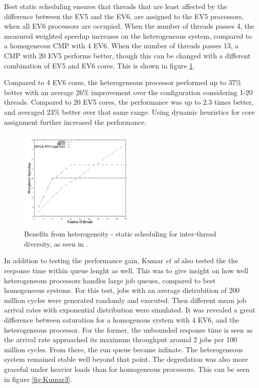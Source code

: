 Best static scheduling ensures that threads that are least affected by the difference between the EV5 and the EV6, are assigned to the EV5 processors, when all EV6 processors are occupied.
When the number of threads passes 4, the measured weighted speedup increases on the heterogeneous system, compared to a homogeneous CMP with 4 EV6.
When the number of threads passes 13, a CMP with 20 EV5 performs better, though this can be changed with a different combination of EV5 and EV6 cores.
This is shown in figure \ref{fig:Kumar2}.

Compared to 4 EV6 cores, the heterogeneous processor performed up to 37\% better with an average 26\% improvement over the configuration considering 1-20 threads. 
Compared to 20 EV5 cores, the performance was up to 2.3 times better, and averaged 23\% better over that same range. \cite{heterogeneous-perf}
Using dynamic heuristics for core assignment further increased the performance.

\begin{figure}[htb]
    \centering
    \includegraphics[width=0.5\textwidth]{Figures/Heterogeneous/Kumar2}
    \caption{Benefits from heterogeneity - static scheduling for inter-thread diversity, as seen in \cite{heterogeneous-perf}.}
    \label{fig:Kumar2}
\end{figure}

In addition to testing the performance gain, Kumar \textit{et al} also tested the the response time within queue lenght as well.
This was to give insight on how well heterogeneous processors handles large job queues, compared to best homogeneous systems.
For this test, jobs with an average distrubition of 200 million cycles were generated randomly and executed.
Then different mean job arrival rates with exponential distribution were simulated.
It was revealed a great difference between saturation for a homogenous system with 4 EV6, and the heterogeneous processor.
For the former, the unbounded response time is seen as the arrival rate approached its maximum throughput around 2 jobs per 100 million cycles.
From there, the run queue became infinate.
The heterogeneous system remained stable well beyond that point.
The degredation was also more graceful under heavier loads than for homogeneous processors.
This can be seen in figure \ref{fig:Kumar3}.

